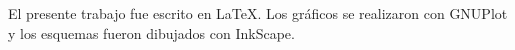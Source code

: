 \begin{center}
\vspace*{8cm}

El presente trabajo fue escrito en \LaTeX{}. Los gráficos se realizaron con GNUPlot y los esquemas fueron dibujados con InkScape.


\end{center}